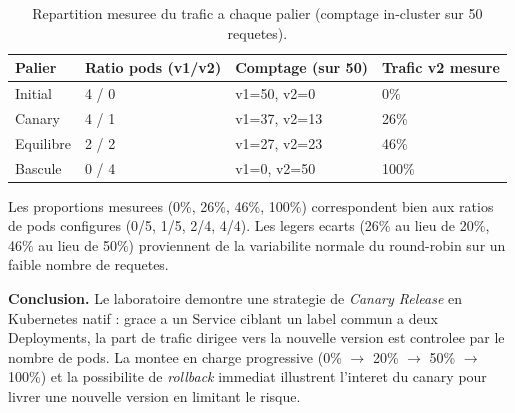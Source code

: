 \documentclass[11pt,a4paper]{report}
\begin{document}
\begin{table}[h!]
\centering
\renewcommand{\arraystretch}{1.3}
\begin{tabular}{p{2.6cm} p{3cm} p{3.2cm} p{3cm}}
\toprule
\textbf{Palier} & \textbf{Ratio pods (v1/v2)} & \textbf{Comptage (sur 50)} & \textbf{Trafic v2 mesure} \\
\midrule
Initial   & 4 / 0 & v1=50, v2=0  & 0\% \\
Canary    & 4 / 1 & v1=37, v2=13 & 26\% \\
Equilibre & 2 / 2 & v1=27, v2=23 & 46\% \\
Bascule   & 0 / 4 & v1=0,  v2=50 & 100\% \\
\bottomrule
\end{tabular}
\caption{Repartition mesuree du trafic a chaque palier (comptage in-cluster sur 50 requetes).}
\end{table}

\noindent Les proportions mesurees (0\%, 26\%, 46\%, 100\%) correspondent bien aux ratios
de pods configures (0/5, 1/5, 2/4, 4/4). Les legers ecarts (26\% au lieu de 20\%, 46\% au
lieu de 50\%) proviennent de la variabilite normale du round-robin sur un faible nombre de
requetes.

\textbf{Conclusion.} Le laboratoire demontre une strategie de \emph{Canary Release} en
Kubernetes natif : grace a un Service ciblant un label commun a deux Deployments, la part
de trafic dirigee vers la nouvelle version est controlee par le nombre de pods. La montee
en charge progressive (0\% $\rightarrow$ 20\% $\rightarrow$ 50\% $\rightarrow$ 100\%) et la
possibilite de \emph{rollback} immediat illustrent l'interet du canary pour livrer une
nouvelle version en limitant le risque.
\end{document}

